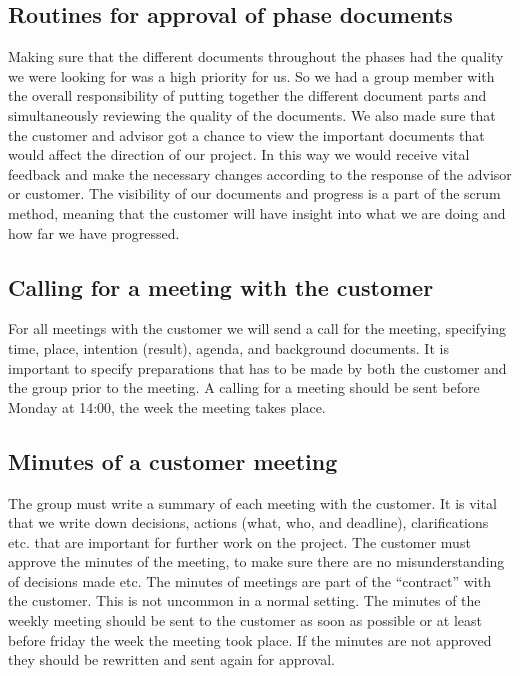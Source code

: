 \subsection{Routines for approval of phase documents}
Making sure that the different documents throughout the phases had the quality we were looking for was a high priority for us. So we had a group member with the overall responsibility of putting together the different document parts and simultaneously reviewing the quality of the documents.
\newline
\newline 
We also made sure that the customer and advisor got a chance to view the important documents that would affect the direction of our project. In this way we would receive vital feedback and make the necessary changes according to the response of the advisor or customer. 
\newline
\newline
The visibility of our documents and progress is a part of the scrum method, meaning that the customer will have insight into what we are doing and how far we have progressed.   

\subsection{Calling for a meeting with the customer}
For all meetings with the customer we will send a call for the meeting, specifying time, place, intention (result), agenda, and background documents. It is important to specify preparations that has to be made by both the customer and the group prior to the meeting.
\newline
\newline
A calling for a meeting should be sent before Monday at 14:00, the week the meeting takes place.

\subsection{Minutes of a customer meeting}
The group must write a summary of each meeting with the customer. It is vital that we write down decisions, actions (what, who, and deadline), clarifications etc. that are important for further work on the project. The customer must approve the minutes of the meeting, to make sure there are no misunderstanding of decisions made etc. The minutes of meetings are part of the “contract” with the customer. This is not uncommon in a normal setting.
\newline
\newline
The minutes of the weekly meeting should be sent to the customer as soon as possible or at least before friday the week the meeting took place. If the minutes are not approved they should be rewritten and sent again for approval. 

